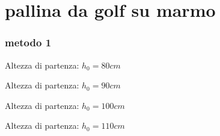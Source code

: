 \documentclass[a4paper]{article}
\theoremstyle{definition}
\begin{document}
	\section*{pallina da golf su marmo}
	\subsubsection*{metodo 1}
\noindent Altezza di partenza: \(h_{0} = 80cm\)
	\begin{table}[!ht]
		\centering
		
	\end{table}

\noindent Altezza di partenza: \(h_{0} = 90cm\)	
	\begin{table}[!ht]
		\centering
		
	\end{table}

\noindent Altezza di partenza: \(h_{0} = 100cm\)
	\begin{table}[!ht]
		\centering
		
	\end{table}

\noindent Altezza di partenza: \(h_{0} = 110cm\)
	\begin{table}[!ht]
		\centering
		
	\end{table}
\end{document}
